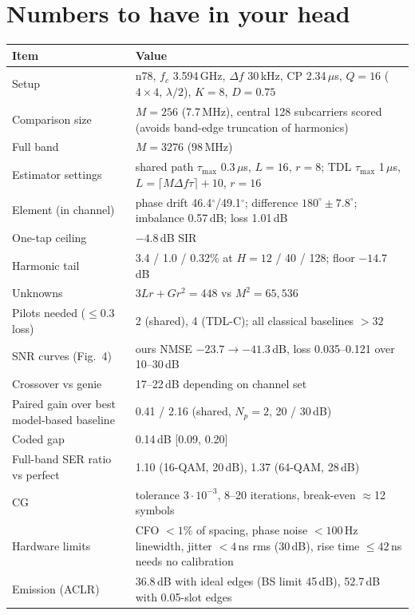 \documentclass[11pt,a4paper]{article}
\begin{document}
\section{Numbers to have in your head}
\begin{center}\small
\begin{tabularx}{\textwidth}{lX}
\toprule
Item & Value\\
\midrule
Setup & n78, $f_c$ 3.594\,GHz, $\Delta f$ 30\,kHz, CP 2.34\,$\mu$s, $Q=16$ ($4\times4$, $\lambda/2$), $K=8$, $D=0.75$\\
Comparison size & $M=256$ (7.7\,MHz), central 128 subcarriers scored (avoids band-edge truncation of harmonics)\\
Full band & $M=3276$ (98\,MHz)\\
Estimator settings & shared path $\tau_{\max}$ 0.3\,$\mu$s, $L=16$, $r=8$; TDL $\tau_{\max}$ 1\,$\mu$s, $L=\lceil M\Delta f\tau\rceil+10$, $r=16$\\
Element (in channel) & phase drift 46.4$^\circ$/49.1$^\circ$; difference $180^\circ\pm7.8^\circ$; imbalance 0.57\,dB; loss 1.01\,dB\\
One-tap ceiling & $-4.8$\,dB SIR\\
Harmonic tail & 3.4 / 1.0 / 0.32\% at $H=12$ / 40 / 128; floor $-14.7$\,dB\\
Unknowns & $3Lr+Gr^2=448$ vs $M^2=65{,}536$\\
Pilots needed ($\le0.3$ loss) & 2 (shared), 4 (TDL-C); all classical baselines $>32$\\
SNR curves (Fig.~4) & ours NMSE $-23.7\to-41.3$\,dB, loss 0.035--0.121 over 10--30\,dB\\
Crossover vs genie & 17--22\,dB depending on channel set\\
Paired gain over best model-based baseline & 0.41 / 2.16 (shared, $N_p=2$, 20 / 30\,dB)\\
Coded gap & 0.14\,dB [0.09, 0.20]\\
Full-band SER ratio vs perfect & 1.10 (16-QAM, 20\,dB), 1.37 (64-QAM, 28\,dB)\\
CG & tolerance $3\cdot10^{-3}$, 8--20 iterations, break-even $\approx$12 symbols\\
Hardware limits & CFO $<1$\% of spacing, phase noise $<100$\,Hz linewidth, jitter $<4$\,ns rms (30\,dB), rise time $\le42$\,ns needs no calibration\\
Emission (ACLR) & 36.8\,dB with ideal edges (BS limit 45\,dB), 52.7\,dB with 0.05-slot edges\\
\bottomrule
\end{tabularx}
\end{center}
\end{document}
